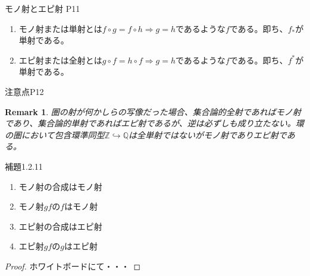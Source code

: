\documentclass[unicode,12pt,aspectratio=169]{beamer}
\newtheorem*{remark}{Remark}
\begin{document}
\begin{frame}{モノ射とエピ射 P11}
    \begin{tcolorbox}
       \begin{definition}
           \begin{enumerate}
               \item モノ射または単射とは$f\circ g=f\circ h \Rightarrow g=h$であるような$f$である。即ち、$f_*$が単射である。
               \item エピ射または全射とは$g\circ f=h\circ f \Rightarrow g=h$であるような$f$である。即ち、$f^*$が単射である。
           \end{enumerate}
       \end{definition}
    \end{tcolorbox}
\end{frame}
\begin{frame}{注意点P12}
    \begin{tcolorbox}
        \begin{remark}
            圏の射が何かしらの写像だった場合、集合論的全射であればモノ射であり、集合論的単射であればエピ射であるが、逆は必ずしも成り立たない。環の圏において包含環準同型$\mathbb{Z}\hookrightarrow \mathbb{Q}$は全単射ではないがモノ射でありエピ射である。
        \end{remark}
    \end{tcolorbox}
\end{frame}
\begin{frame}{補題1.2.11}
    \begin{tcolorbox}
        \begin{theorem}
            \begin{enumerate}
                \item モノ射の合成はモノ射
                \item モノ射$gf$の$f$はモノ射
                \item エピ射の合成はエピ射
                \item エピ射$gf$の$g$はエピ射
            \end{enumerate}
            \begin{proof}
                ホワイトボードにて・・・
            \end{proof}
        \end{theorem}
    \end{tcolorbox}
\end{frame}
\end{document}

